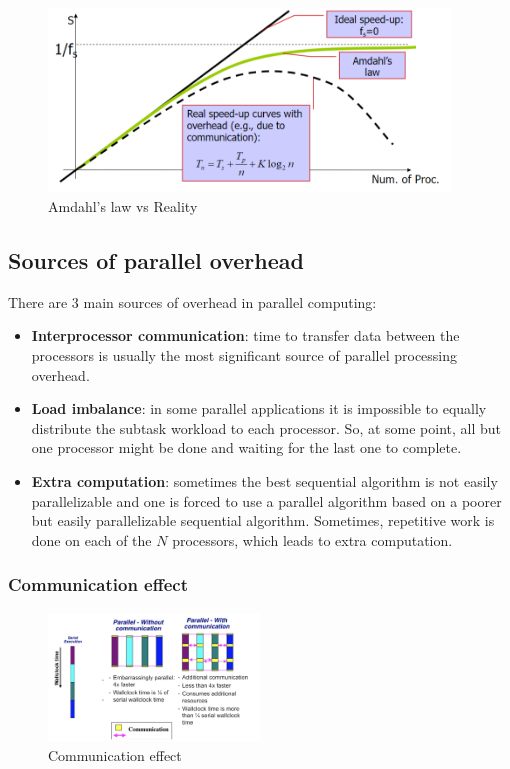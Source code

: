 \begin{figure}[H]
    \centering
    \includegraphics[width=0.95\textwidth]{figures/amdahl_reality.png}
    \caption{Amdahl's law vs Reality}
    \label{fig:amdahl_reality}
\end{figure}

\subsection{Sources of parallel overhead}

There are 3 main sources of overhead in parallel computing:

\begin{itemize}
    \item \textbf{Interprocessor communication}: time to transfer data between the processors
    is usually the most significant source of parallel processing overhead.

    \item \textbf{Load imbalance}: in some parallel applications it is impossible to 
    equally distribute the subtask workload to each processor. So, at some point, all
    but one processor might be done and waiting for the last one to complete.

    \item \textbf{Extra computation}: sometimes the best sequential algorithm is not 
    easily parallelizable and one is forced to use a parallel algorithm based on a poorer
    but easily parallelizable sequential algorithm. Sometimes, repetitive work is done
    on each of the $N$ processors, which leads to extra computation.
\end{itemize}


\subsubsection{Communication effect}

\begin{figure}[H]
    \centering
    \includegraphics[width=0.5\textwidth]{figures/comm_effect.png}
    \caption{Communication effect}
    \label{fig:comm_effect}
\end{figure}

